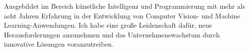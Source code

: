 %
%
%
\par{
    Ausgebildet im Bereich künstliche Intelligenz und Programmierung mit mehr als acht Jahren Erfahrung in der Entwicklung von Computer Vision- und Machine Learning-Anwendungen. Ich habe eine große Leidenschaft dafür, neue Herausforderungen anzunehmen und das Unternehmenswachstum durch innovative Lösungen voranzutreiben.
}
\vspace{6.6mm}

